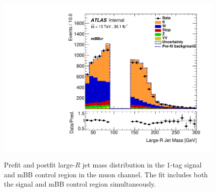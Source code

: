\begin{figure}[!htbp]
\begin{center}
\includegraphics[scale=0.33]{./figures/boosted/ABCD_1tag0bjet/QCDFloat_1tag_SRmBBcrFit_mBBcr_Mu_Postfit}\\
\caption{Prefit and postfit large-$R$ jet mass distribution in the 1-tag signal and mBB control region in the muon channel. The fit includes
both the signal and mBB control region simultaneously.}
\label{fig:boostedabcd_mbbcrSRsimul_muon_fit}
\end{center}
\end{figure}

\FloatBarrier

%
%
